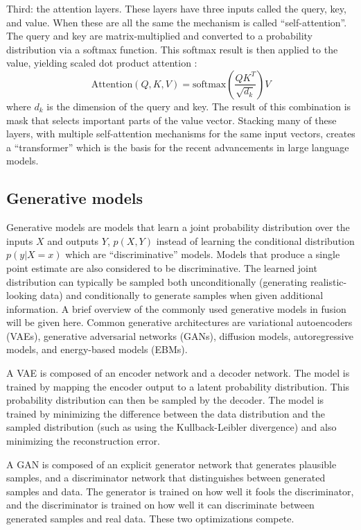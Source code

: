 Third: the attention layers. These layers have three inputs called the query, key, and value. When these are all the same the mechanism is called ``self-attention''. The query and key are matrix-multiplied and converted to a probability distribution via a softmax function. This softmax result is then applied to the value, yielding scaled dot product attention \cite{vaswani_attention_2017}: 
\begin{equation}
	\text{Attention}(Q, K, V) = \text{softmax}\left( \frac{QK^T}{\sqrt{d_k}} \right)V
\end{equation}
where $d_k$ is the dimension of the query and key.
The result of this combination is mask that selects important parts of the value vector. Stacking many of these layers, with multiple self-attention mechanisms for the same input vectors, creates a ``transformer'' \cite{vaswani_attention_2017} which is the basis for the recent advancements in large language models. 

\subsection{Generative models}
Generative models are models that learn a joint probability distribution over the inputs $X$ and outputs $Y$, $p(X, Y)$  instead of learning the conditional distribution $p(y \vert X=x)$ which are ``discriminative'' models. Models that produce a single point estimate are also considered to be discriminative. The learned joint distribution can typically be sampled both unconditionally (generating realistic-looking data) and conditionally to generate samples when given additional information. A brief overview of the commonly used generative models in fusion will be given here. Common generative architectures are variational autoencoders (VAEs), generative adversarial networks (GANs), diffusion models, autoregressive models, and energy-based models (EBMs).

A VAE \cite{kingma_auto-encoding_2022} is composed of an encoder network and a decoder network. The model is trained by mapping the encoder output to a latent probability distribution. This probability distribution can then be sampled by the decoder. The model is trained by minimizing the difference between the data distribution and the sampled distribution (such as using the Kullback-Leibler divergence) and also minimizing the reconstruction error.

A GAN \cite{goodfellow_generative_2014} is composed of an explicit generator network that generates plausible samples, and a discriminator network that distinguishes between generated samples and data. The generator is trained on how well it fools the discriminator, and the discriminator is trained on how well it can discriminate between generated samples and real data. These two optimizations compete.

